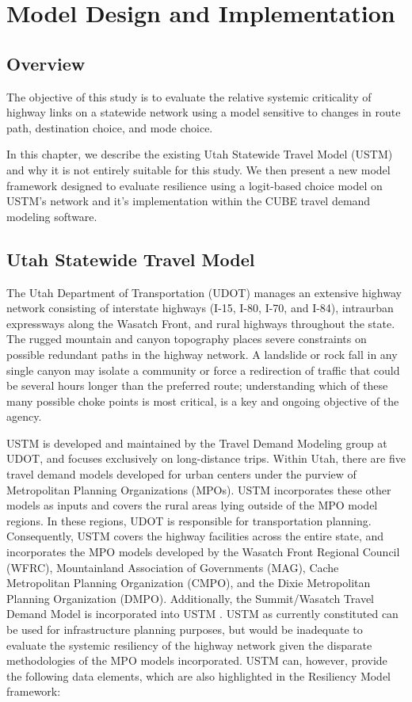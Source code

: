 \chapter{Model Design and Implementation}
\label{chp:chapter3}
\graphicspath{{figures/}{figures/chapter3/}}

\section{Overview} \label{Overview}

The objective of this study is to evaluate the relative systemic
criticality of highway links on a statewide network using a model
sensitive to changes in route path, destination choice, and mode choice.

In this chapter, we describe the existing Utah Statewide Travel Model (USTM) and why
it is not entirely suitable for this study. We then present a new model
framework designed to evaluate resilience using a logit-based choice model on
USTM's network and it's implementation within the CUBE travel demand
modeling software.

\section{Utah Statewide Travel Model} \label{Utah Statewide Travel Model}

The Utah Department of Transportation (UDOT) manages an extensive highway
network consisting of interstate highways (I-15, I-80, I-70, and I-84),
intraurban expressways along the Wasatch Front, and rural highways throughout
the state. The rugged mountain and canyon topography places
severe constraints on possible redundant paths in the highway network. A
landslide or rock fall in any single canyon may isolate a community or force a
redirection of traffic that could be several hours longer than the preferred
route; understanding which of these many possible choke points is most
critical, is a key and ongoing objective of the agency.

USTM is developed and maintained by
the Travel Demand Modeling group at UDOT, and focuses exclusively on
long-distance trips. Within Utah, there are five travel
demand models developed for urban centers under the purview of  Metropolitan
Planning Organizations (MPOs). USTM incorporates these other models as inputs and covers
the rural areas lying outside of the MPO model regions. In these regions, UDOT
is responsible for transportation planning. Consequently, USTM covers the
highway facilities across the entire state, and incorporates the MPO models
developed by the Wasatch Front Regional Council (WFRC), Mountainland
Association of Governments (MAG), Cache Metropolitan Planning Organization
(CMPO), and the Dixie Metropolitan Planning Organization (DMPO). Additionally,
the Summit/Wasatch Travel Demand Model is incorporated into USTM \citep{udot2021}.
USTM as currently
constituted can be used for infrastructure planning purposes, but would be
inadequate to evaluate the systemic resiliency of the highway network given
the disparate methodologies of the MPO models incorporated. USTM can, however, provide the
following data elements, which are also highlighted in the Resiliency
Model framework:

